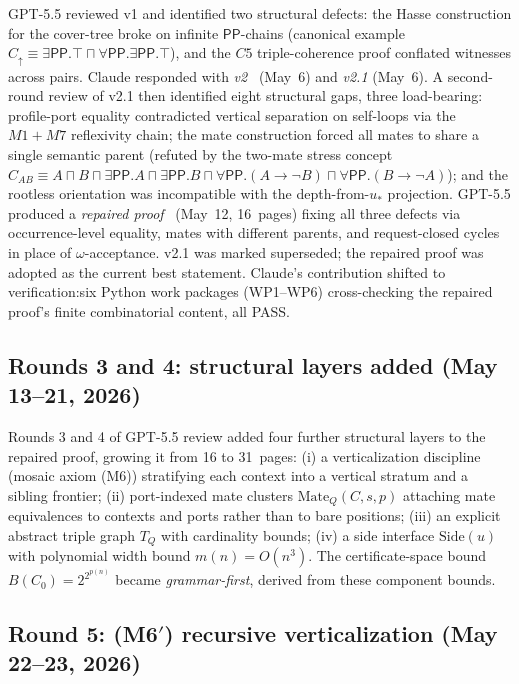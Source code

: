 \documentclass[
]{ceurart}
\theoremstyle{definition}
\newcommand{\PP}{\ensuremath{\mathsf{PP}}}
\begin{document}
GPT-5.5 reviewed v1 and identified two structural defects: the
Hasse construction for the cover-tree broke on infinite $\PP$-chains
(canonical example $C_\uparrow\equiv\exists\PP.\top\sqcap\forall
\PP.\exists\PP.\top$), and the $C5$ triple-coherence proof
conflated witnesses across pairs.  Claude responded with
\textit{v2}~\cite{CompletenessExtraction} (May~6) and
\textit{v2.1} (May~6).  A second-round review of v2.1 then
identified eight structural gaps, three load-bearing:
profile-port equality contradicted vertical separation on
self-loops via the $M1{+}M7$ reflexivity chain; the mate
construction forced all mates to share a single semantic parent
(refuted by the two-mate stress concept
$C_{AB}\equiv A\sqcap B\sqcap\exists\PP.A\sqcap\exists\PP.B\sqcap
\forall\PP.(A\to\lnot B)\sqcap\forall\PP.(B\to\lnot A)$); and
the rootless orientation was incompatible with the depth-from-$u_*$
projection.  GPT-5.5 produced a \textit{repaired
proof}~\cite{GPT55Repaired} (May~12, 16~pages) fixing all three
defects via occurrence-level equality, mates with different
parents, and request-closed cycles in place of
$\omega$-acceptance.  v2.1 was marked superseded; the repaired
proof was adopted as the current best statement.  Claude's
contribution shifted to verification:\@ six Python work packages
(WP1--WP6) cross-checking the repaired proof's finite
combinatorial content, all PASS.

\subsection{Rounds 3 and 4: structural layers added (May 13--21,
2026)}

Rounds 3 and 4 of GPT-5.5 review added four further structural
layers to the repaired proof, growing it from 16 to 31~pages:
(i) a verticalization discipline (mosaic axiom (M6)) stratifying
each context into a vertical stratum and a sibling frontier;
(ii) port-indexed mate clusters $\mathrm{Mate}_Q(C,s,p)$
attaching mate equivalences to contexts and ports rather than to
bare positions; (iii) an explicit abstract triple graph $T_Q$
with cardinality bounds; (iv) a side interface $\mathrm{Side}(u)$
with polynomial width bound $m(n)=O(n^3)$.  The certificate-space
bound $B(C_0)=2^{2^{p(n)}}$ became \emph{grammar-first}, derived
from these component bounds.

\subsection{Round 5: (M6$'$) recursive verticalization
(May 22--23, 2026)}
\end{document}
